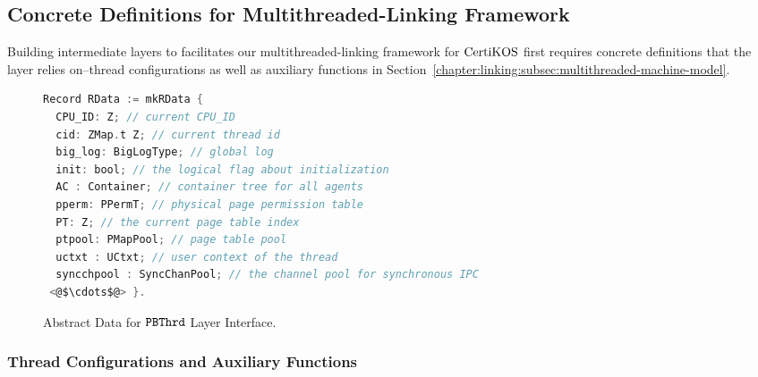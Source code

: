 \subsection{Concrete Definitions for Multithreaded-Linking Framework} 
\label{chapter:certikos:phbthread}

Building intermediate layers to facilitates our multithreaded-linking framework 
for $\mathrm{CertiKOS}$ first requires  concrete definitions 
that the layer relies on--thread configurations as well as auxiliary functions in Section~\ref{chapter:linking:subsec:multithreaded-machine-model}.

\begin{figure}
\begin{lstlisting}[language=C]
Record RData := mkRData {
  CPU_ID: Z; // current CPU_ID 
  cid: ZMap.t Z; // current thread id
  big_log: BigLogType; // global log
  init: bool; // the logical flag about initialization
  AC : Container; // container tree for all agents
  pperm: PPermT; // physical page permission table 
  PT: Z; // the current page table index
  ptpool: PMapPool; // page table pool
  uctxt : UCtxt; // user context of the thread
  syncchpool : SyncChanPool; // the channel pool for synchronous IPC
 <@$\cdots$@> }.
\end{lstlisting}
\caption{Abstract Data for  ${{\mathrm{\texttt{PBThrd}}}}$ Layer Interface.}
\label{fig:chapter:certikos:abstract-data-for-pbthread-layer}
\end{figure}



\subsubsection{Thread Configurations and Auxiliary Functions}

